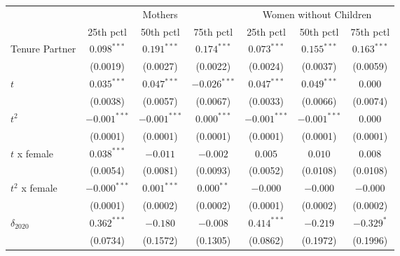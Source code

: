 \begin{tabular}{l|ccc|ccc}
\toprule
{} & \multicolumn{3}{c}{Mothers} & \multicolumn{3}{c}{Women without Children} \\
{} &       25th pctl &       50th pctl &       75th pctl &              25th pctl &       50th pctl &       75th pctl \\
\midrule
Tenure Partner                         &   $0.098^{***}$ &   $0.191^{***}$ &   $0.174^{***}$ &          $0.073^{***}$ &   $0.155^{***}$ &   $0.163^{***}$ \\
                                       &        (0.0019) &        (0.0027) &        (0.0022) &               (0.0024) &        (0.0037) &        (0.0059) \\
$t$                                    &   $0.035^{***}$ &   $0.047^{***}$ &  $-0.026^{***}$ &          $0.047^{***}$ &   $0.049^{***}$ &         $0.000$ \\
                                       &        (0.0038) &        (0.0057) &        (0.0067) &               (0.0033) &        (0.0066) &        (0.0074) \\
$t^2$                                  &  $-0.001^{***}$ &  $-0.001^{***}$ &   $0.000^{***}$ &         $-0.001^{***}$ &  $-0.001^{***}$ &         $0.000$ \\
                                       &        (0.0001) &        (0.0001) &        (0.0001) &               (0.0001) &        (0.0001) &        (0.0001) \\
$t$ x female                           &   $0.038^{***}$ &        $-0.011$ &        $-0.002$ &                $0.005$ &         $0.010$ &         $0.008$ \\
                                       &        (0.0054) &        (0.0081) &        (0.0093) &               (0.0052) &        (0.0108) &        (0.0108) \\
$t^2$ x female                         &  $-0.000^{***}$ &   $0.001^{***}$ &    $0.000^{**}$ &               $-0.000$ &        $-0.000$ &        $-0.000$ \\
                                       &        (0.0001) &        (0.0002) &        (0.0002) &               (0.0001) &        (0.0002) &        (0.0002) \\
$\delta_{2020}$                        &   $0.362^{***}$ &        $-0.180$ &        $-0.008$ &          $0.414^{***}$ &        $-0.219$ &      $-0.329^*$ \\
                                       &        (0.0734) &        (0.1572) &        (0.1305) &               (0.0862) &        (0.1972) &        (0.1996) \\

\end{tabular}
